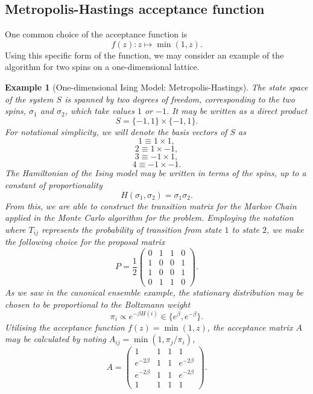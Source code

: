 \documentclass[]{article}
\numberwithin{equation}{section}
\theoremstyle{break}
\newtheorem*{example}{Example}
\begin{document}
\subsection{Metropolis-Hastings acceptance function}
One common choice of the acceptance function is
\begin{equation}
f(z): z\mapsto \min(1,z).
\label{eq:mh_function}
\end{equation}
Using this specific form of the function, we may consider an example of the algorithm for two spins on a one-dimensional lattice.
\begin{example}[One-dimensional Ising Model: Metropolis-Hastings]
    The state space of the system $S$ is spanned by two degrees of freedom, corresponding to the two spins, $\sigma_1$ and $\sigma_2$, which take values $1$ or $-1$. It may be written as a direct product
    \[S = \{-1, 1\} \times \{-1, 1\}.\]
    For notational simplicity, we will denote the basis vectors of $S$ as
    \[1 \equiv 1 \times 1,\]
    \[2 \equiv 1 \times -1,\]
    \[3 \equiv -1 \times 1,\]
    \[4 \equiv -1 \times -1.\]
    The Hamiltonian of the Ising model may be written in terms of the spins, up to a constant of proportionality
    \[H(\sigma_1, \sigma_2) = \sigma_1\sigma_2.\]
    From this, we are able to construct the transition matrix for the Markov Chain applied in the Monte Carlo algorithm for the problem. Employing the notation where $T_{ij}$ represents the probability of transition from state $1$ to state $2$, we make the following choice for the proposal matrix
    \[P = \frac{1}{2}\begin{pmatrix}
        0 & 1 & 1 & 0 \\
        1 & 0 & 0 & 1 \\
        1 & 0 & 0 & 1 \\
        0 & 1 & 1 & 0 
    \end{pmatrix}.\] 
    As we saw in the canonical ensemble example, the stationary distribution may be chosen to be proportional to the Boltzmann weight
    \[\pi_i \propto e^{-\beta H(i)} \in \{e^{\beta}, e^{-\beta}\}.\]
    Utilising the acceptance function $f(z) = \min(1, z)$, the acceptance matrix $A$ may be calculated by noting $A_{ij} = \min(1, \pi_j/\pi_i)$,
    \[A = \begin{pmatrix}
        1 & 1 & 1 & 1\\
        e^{-2\beta} & 1 & 1 & e^{-2\beta} \\
        e^{-2\beta} & 1 & 1 & e^{-2\beta} \\
         1 & 1 & 1 & 1
    \end{pmatrix}.\]

\end{example}
\end{document}

